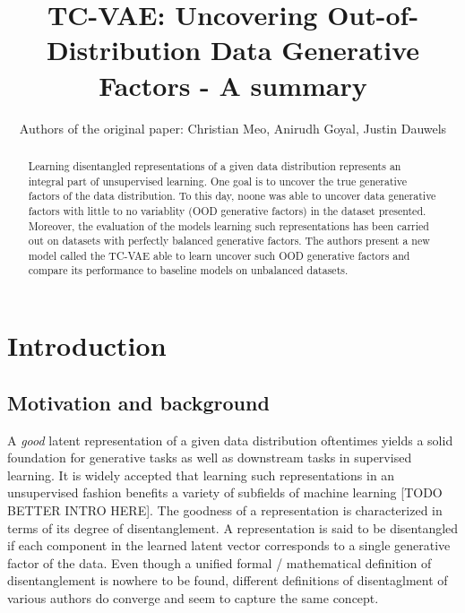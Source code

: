 \documentclass[twoside,11pt]{article}
\begin{document}
\title{TC-VAE: Uncovering Out-of-Distribution Data Generative Factors - A summary}

\author{Authors of the original paper: Christian Meo, Anirudh Goyal, Justin Dauwels}
\maketitle


\begin{abstract}%
  Learning disentangled representations of a given data distribution represents an integral part of unsupervised learning.
  One goal is to uncover the true generative factors of the data distribution.
  To this day, noone was able to uncover data generative factors with little to no variablity (OOD generative factors) in the dataset presented.
  Moreover, the evaluation of the models learning such representations has been carried out on datasets with perfectly balanced generative factors.
  The authors present a new model called the TC-VAE able to learn uncover such OOD generative factors and compare its performance to baseline models on unbalanced datasets.



\end{abstract}

\section{Introduction}
\subsection{Motivation and background}
A \textit{good} latent representation of a given data distribution oftentimes yields a solid foundation for generative tasks as well as downstream tasks in supervised learning. It is widely accepted that learning such representations in an unsupervised fashion benefits a variety of subfields of machine learning [TODO BETTER INTRO HERE].
The goodness of a representation is characterized in terms of its degree of disentanglement. A representation is said to be disentangled if each component in the learned latent vector corresponds to a single generative factor of the data. Even though a unified formal / mathematical definition of disentanglement is nowhere to be found, different definitions of disentaglment of various authors do converge and seem to capture the same concept.
\end{document}

